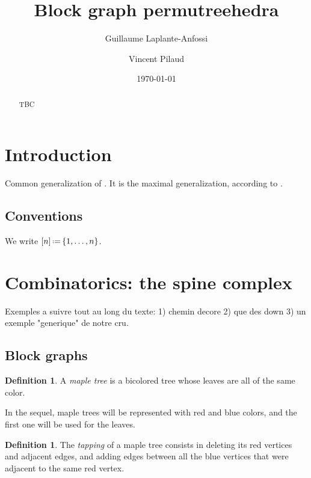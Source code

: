 \documentclass{amsart}
\title{Block graph permutreehedra}
\author{Guillaume Laplante-Anfossi}
\author{Vincent Pilaud}
\date{\today}
\theoremstyle{definition}
\newtheorem{definition}[theorem]{Definition}
\newcommand{\eqdef}{\mbox{\,\raisebox{0.2ex}{\scriptsize\ensuremath{\mathrm:}}\ensuremath{=}\,}} %
\begin{document}
\begin{abstract}
TBC
\end{abstract}

\maketitle


\section*{Introduction}

Common generalization of \cite{PilaudSignedTree13,LangePilaud13,PonsPilaud18,LA21}.
It is the maximal generalization, according to \cite{Pilaud14}.

\subsection*{Conventions} We write $[n] \eqdef \{1,\ldots,n\}$.


\section{Combinatorics: the spine complex}

Exemples a suivre tout au long du texte: 1) chemin decore 2) que des down 3) un exemple "generique" de notre cru.


\subsection{Block graphs}

\begin{definition}
  A \emph{maple tree} is a bicolored tree whose leaves are all of the same color. 
\end{definition}

In the sequel, maple trees will be represented with red and blue colors, and the first one will be used for the leaves.

\begin{definition}
  The \emph{tapping} of a maple tree consists in deleting its red vertices and adjacent edges, and adding edges between all the blue vertices that were adjacent to the same red vertex. 
\end{definition}
\end{document}
